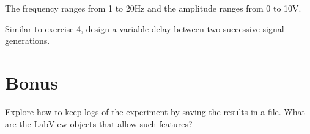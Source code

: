 \documentclass{labo}
\begin{document}
The frequency ranges from 1 to 20Hz and the amplitude ranges from 0 to 10V.

Similar to exercise 4, design a variable delay between two successive signal generations.



\section{Bonus}
Explore how to keep logs of the experiment by saving the results in a file.
What are the LabView objects that allow such features?



\end{document}
